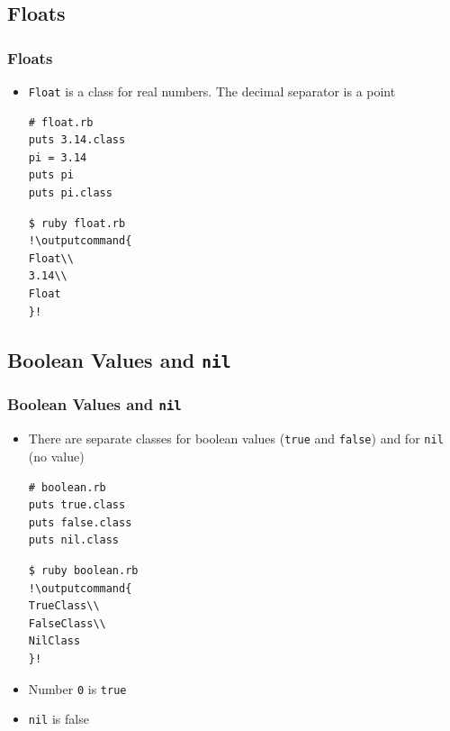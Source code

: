 \documentclass{beamer}
\newcommand{\outputcommand}[1]{\color{darkgreen}{#1}}
\begin{document}
\subsection{Floats}
\begin{frame}[fragile]
\frametitle{Floats}
\begin{itemize}
 \item \texttt{Float} is a class for real numbers. The decimal separator is a point

\lstset{language=Ruby, style=eclipse}
\begin{lstlisting}[escapechar=&]
# float.rb
puts 3.14.class
pi = 3.14
puts pi
puts pi.class
\end{lstlisting}
\lstset{language=shell}
\begin{lstlisting}[numbers=none, escapechar=!]
$ ruby float.rb 
!\outputcommand{
Float\\
3.14\\
Float
}!
\end{lstlisting}
\end{itemize}

\end{frame}
\subsection{Boolean Values and \texttt{nil}}
\begin{frame}[fragile]
\frametitle{Boolean Values and \texttt{nil}}
\begin{itemize}
 \item There are separate classes for boolean values (\texttt{true} and \texttt{false}) and for \texttt{nil} (no value) 
\lstset{language=Ruby, style=eclipse}
\begin{lstlisting}[escapechar=&]
# boolean.rb
puts true.class
puts false.class
puts nil.class
\end{lstlisting}
\lstset{language=shell}
\begin{lstlisting}[numbers=none, escapechar=!]
$ ruby boolean.rb 
!\outputcommand{
TrueClass\\
FalseClass\\
NilClass
}!
\end{lstlisting}
\item Number \texttt{0} is \texttt{true}
\item \texttt{nil} is false
\end{itemize}
\end{frame}
\end{document}
